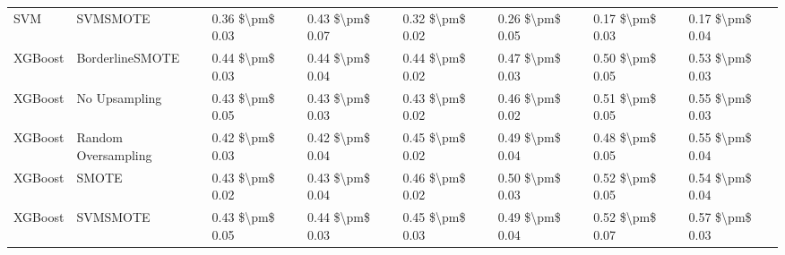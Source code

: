 \begin{tabular}{llllllll}
                            SVM &                      SVMSMOTE & 0.36 \$\textbackslash pm\$ 0.03 &           0.43 \$\textbackslash pm\$ 0.07 &       0.32 \$\textbackslash pm\$ 0.02 &        0.26 \$\textbackslash pm\$ 0.05 &                         0.17 \$\textbackslash pm\$ 0.03 &     0.17 \$\textbackslash pm\$ 0.04 \\
                        XGBoost &               BorderlineSMOTE & 0.44 \$\textbackslash pm\$ 0.03 &           0.44 \$\textbackslash pm\$ 0.04 &       0.44 \$\textbackslash pm\$ 0.02 &        0.47 \$\textbackslash pm\$ 0.03 &                         0.50 \$\textbackslash pm\$ 0.05 &     0.53 \$\textbackslash pm\$ 0.03 \\
                        XGBoost &                 No Upsampling & 0.43 \$\textbackslash pm\$ 0.05 &           0.43 \$\textbackslash pm\$ 0.03 &       0.43 \$\textbackslash pm\$ 0.02 &        0.46 \$\textbackslash pm\$ 0.02 &                         0.51 \$\textbackslash pm\$ 0.05 &     0.55 \$\textbackslash pm\$ 0.03 \\
                        XGBoost &           Random Oversampling & 0.42 \$\textbackslash pm\$ 0.03 &           0.42 \$\textbackslash pm\$ 0.04 &       0.45 \$\textbackslash pm\$ 0.02 &        0.49 \$\textbackslash pm\$ 0.04 &                         0.48 \$\textbackslash pm\$ 0.05 &     0.55 \$\textbackslash pm\$ 0.04 \\
                        XGBoost &                         SMOTE & 0.43 \$\textbackslash pm\$ 0.02 &           0.43 \$\textbackslash pm\$ 0.04 &       0.46 \$\textbackslash pm\$ 0.02 &        0.50 \$\textbackslash pm\$ 0.03 &                         0.52 \$\textbackslash pm\$ 0.05 &     0.54 \$\textbackslash pm\$ 0.04 \\
                        XGBoost &                      SVMSMOTE & 0.43 \$\textbackslash pm\$ 0.05 &           0.44 \$\textbackslash pm\$ 0.03 &       0.45 \$\textbackslash pm\$ 0.03 &        0.49 \$\textbackslash pm\$ 0.04 &                         0.52 \$\textbackslash pm\$ 0.07 &     0.57 \$\textbackslash pm\$ 0.03 \\
\bottomrule
\end{tabular}
